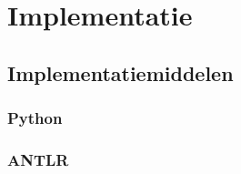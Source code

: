 
\chapter{Implementatie}
\label{chapter:implementatie}

\TODO

\section{Implementatiemiddelen}
\label{section:devel-tools}

\TODO

\subsection{Python}
\label{subsection:devel-python}

\TODO

\subsection{ANTLR}
\label{subsection:devel-antlr}

\TODO
